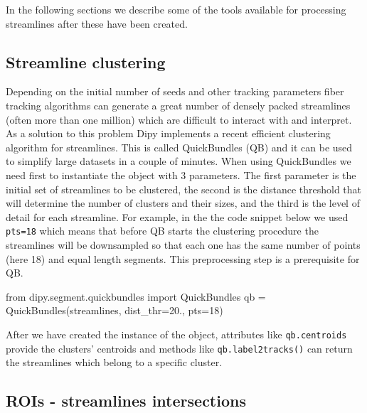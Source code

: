 \documentclass{bioinfo}
\begin{document}
In the following sections we describe some of the tools available for processing
streamlines after these have been created.
\subsection{Streamline clustering}\label{quickbundles}
Depending on the initial number of seeds and other tracking parameters
fiber tracking algorithms can generate a great number of densely packed
streamlines (often more than one million) which are difficult to interact with
and interpret. As a solution to this problem Dipy implements a recent
efficient clustering algorithm for streamlines. This is called QuickBundles (QB)
\citep{Garyfallidis_thesis,garyfallidis-etal:12} and it can be used to
simplify large datasets in a couple of minutes.
When using QuickBundles we need first to instantiate the object with 3
parameters. The first parameter is the initial set of streamlines to be
clustered, the second is the distance threshold that will determine the number of clusters and their sizes,
and the third is the level of detail for each streamline. For example, in the
the code snippet below we used \texttt{pts=18} which means that before QB
starts the clustering procedure the streamlines will be downsampled so that
each one has the same number of points (here 18) and equal length segments. This
preprocessing step is a prerequisite for QB.
\begin{python}
from dipy.segment.quickbundles import QuickBundles
qb = QuickBundles(streamlines, dist_thr=20.,
                  pts=18)
\end{python}
After we have created the instance of the object, attributes like
\texttt{qb.centroids} provide the clusters' centroids and methods like
\texttt{qb.label2tracks()} can return the streamlines which belong to a
specific cluster.

\subsection{ROIs - streamlines intersections}
\end{document}

